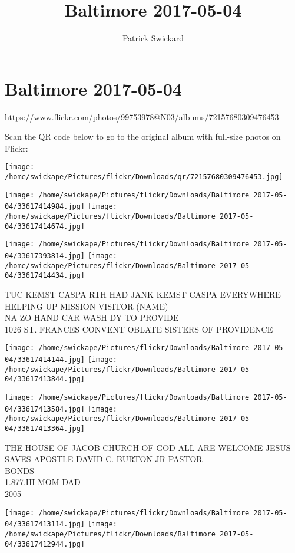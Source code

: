 \documentclass[10pt,letterpaper]{article}
\title{Baltimore 2017-05-04}
\author{Patrick Swickard}
\date{}
\begin{document}
\section*{Baltimore 2017-05-04}

\url{https://www.flickr.com/photos/99753978@N03/albums/72157680309476453}

Scan the QR code below to go to the original album with full-size photos on Flickr:

\texttt{[image: /home/swickape/Pictures/flickr/Downloads/qr/72157680309476453.jpg]}
\pagebreak

\texttt{[image: /home/swickape/Pictures/flickr/Downloads/Baltimore 2017-05-04/33617414984.jpg]}
\texttt{[image: /home/swickape/Pictures/flickr/Downloads/Baltimore 2017-05-04/33617414674.jpg]}

\texttt{[image: /home/swickape/Pictures/flickr/Downloads/Baltimore 2017-05-04/33617393814.jpg]}
\texttt{[image: /home/swickape/Pictures/flickr/Downloads/Baltimore 2017-05-04/33617414434.jpg]}

TUC KEMST CASPA RTH HAD JANK KEMST CASPA EVERYWHERE\\
HELPING UP MISSION VISITOR (NAME)\\
NA ZO HAND CAR WASH DY TO PROVIDE\\
1026 ST. FRANCES CONVENT OBLATE SISTERS OF PROVIDENCE
\pagebreak

\texttt{[image: /home/swickape/Pictures/flickr/Downloads/Baltimore 2017-05-04/33617414144.jpg]}
\texttt{[image: /home/swickape/Pictures/flickr/Downloads/Baltimore 2017-05-04/33617413844.jpg]}

\texttt{[image: /home/swickape/Pictures/flickr/Downloads/Baltimore 2017-05-04/33617413584.jpg]}
\texttt{[image: /home/swickape/Pictures/flickr/Downloads/Baltimore 2017-05-04/33617413364.jpg]}

THE HOUSE OF JACOB CHURCH OF GOD ALL ARE WELCOME JESUS SAVES APOSTLE DAVID C. BURTON JR PASTOR\\
BONDS\\
1.877.HI MOM DAD\\
2005
\pagebreak

\texttt{[image: /home/swickape/Pictures/flickr/Downloads/Baltimore 2017-05-04/33617413114.jpg]}
\texttt{[image: /home/swickape/Pictures/flickr/Downloads/Baltimore 2017-05-04/33617412944.jpg]}
\end{document}
